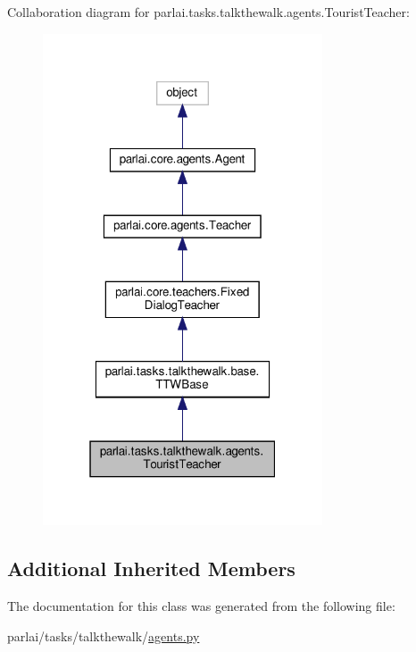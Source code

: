 Collaboration diagram for parlai.\+tasks.\+talkthewalk.\+agents.\+Tourist\+Teacher\+:
\nopagebreak
\begin{figure}[H]
\begin{center}
\leavevmode
\includegraphics[width=235pt]{classparlai_1_1tasks_1_1talkthewalk_1_1agents_1_1TouristTeacher__coll__graph}
\end{center}
\end{figure}
\subsection*{Additional Inherited Members}


The documentation for this class was generated from the following file\+:\begin{DoxyCompactItemize}
\item 
parlai/tasks/talkthewalk/\hyperlink{parlai_2tasks_2talkthewalk_2agents_8py}{agents.\+py}\end{DoxyCompactItemize}
